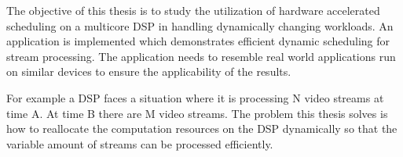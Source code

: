 The objective of this thesis is to study the utilization of hardware accelerated scheduling on a multicore DSP in handling dynamically changing workloads. An application is implemented which demonstrates efficient dynamic scheduling for stream processing. The application needs to resemble real world applications run on similar devices to ensure the applicability of the results.

For example a DSP faces a situation where it is processing N video streams at time A. At time B there are M video streams. The problem this thesis solves is how to reallocate the computation resources on the DSP dynamically so that the variable amount of streams can be processed efficiently.